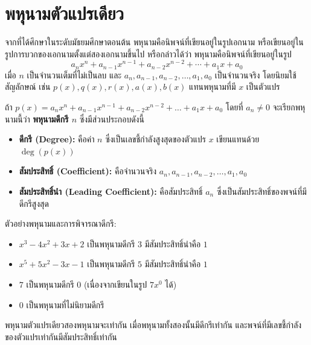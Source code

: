 \newpage

\section{พหุนามตัวแปรเดียว}

จากที่ได้ศึกษาในระดับมัธยมศึกษาตอนต้น พหุนามคือนิพจน์ที่เขียนอยู่ในรูปเอกนาม หรือเขียนอยู่ในรูปการบวกของเอกนามตั้งแต่สองเอกนามขึ้นไป หรือกล่าวได้ว่า พหุนามคือนิพจน์ที่เขียนอยู่ในรูป
\begin{equation*}
	a_{n} x^{n} + a_{n-1} x^{n-1} + a_{n-2} x^{n-2} + \cdots + a_{1} x + a_{0}
\end{equation*}
เมื่อ $n$ เป็นจำนวนเต็มที่ไม่เป็นลบ และ $a_{n}, a_{n-1}, a_{n-2}, \ldots, a_{1}, a_{0}$ เป็นจำนวนจริง โดยนิยมใช้สัญลักษณ์ เช่น $p(x), q(x), r(x), a(x), b(x)$ แทนพหุนามที่มี $x$ เป็นตัวแปร

\begin{remarkbox}
	ถ้า $p(x) = a_{n}x^{n} + a_{n-1}x^{n-1} + a_{n-2}x^{n-2} + \dots + a_{1}x + a_{0}$ โดยที่ $a_{n} \neq 0$ จะเรียกพหุนามนี้ว่า \textbf{พหุนามดีกรี $n$} ซึ่งมีส่วนประกอบดังนี้
	\begin{itemize}
		\item \textbf{ดีกรี (Degree):} คือค่า $n$ ซึ่งเป็นเลขชี้กำลังสูงสุดของตัวแปร $x$ เขียนแทนด้วย $\operatorname{deg}(p(x))$
		\item \textbf{สัมประสิทธิ์ (Coefficient):} คือจำนวนจริง $a_{n}, a_{n-1}, a_{n-2}, \dots, a_{1}, a_{0}$
		\item \textbf{สัมประสิทธิ์นำ (Leading Coefficient):} คือสัมประสิทธิ์ $a_{n}$ ซึ่งเป็นสัมประสิทธิ์ของพจน์ที่มีดีกรีสูงสุด
	\end{itemize}
\end{remarkbox}

\begin{examplebox}
	ตัวอย่างพหุนามและการพิจารณาดีกรี:
	\begin{itemize}
		\item $x^{3}-4 x^{2}+3 x+2$ เป็นพหุนามดีกรี $3$ มีสัมประสิทธิ์นำคือ $1$
		\item $x^{5}+5 x^{2}-3 x-1$ เป็นพหุนามดีกรี $5$ มีสัมประสิทธิ์นำคือ $1$
		\item $7$ เป็นพหุนามดีกรี $0$ (เนื่องจากเขียนในรูป $7x^0$ ได้)
		\item $0$ เป็นพหุนามที่ไม่นิยามดีกรี
	\end{itemize}    
\end{examplebox}

พหุนามตัวแปรเดียวสองพหุนามจะเท่ากัน เมื่อพหุนามทั้งสองนั้นมีดีกรีเท่ากัน และพจน์ที่มีเลขชี้กำลัง ของตัวแปรเท่ากันมีสัมประสิทธิ์เท่ากัน

